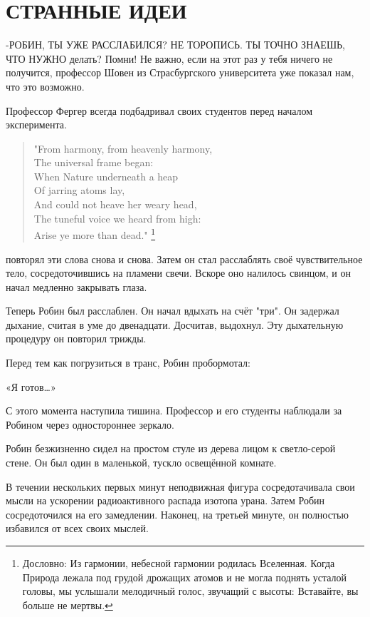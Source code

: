 \documentclass[a4paper,12pt]{book}
\begin{document}
\chapter{СТРАННЫЕ ИДЕИ}
\noindent\par-РОБИН, ТЫ УЖЕ РАССЛАБИЛСЯ? НЕ ТОРОПИСЬ. ТЫ ТОЧНО ЗНАЕШЬ, ЧТО НУЖНО делать? Помни! Не важно, если на этот раз у тебя ничего не получится, профессор Шовен из Страсбургского университета уже показал нам, что это возможно.
\par
Профессор Фергер всегда подбадривал своих студентов перед началом эксперимента.
\begin{quote}
"From harmony, from heavenly harmony,\\
The universal frame began:\\
When Nature underneath a heap\\
Of jarring atoms lay,\\
And could not heave her weary head,\\
The tuneful voice we heard from high:\\
Arise ye more than dead." \footnote{Дословно: Из гармонии, небесной гармонии родилась Вселенная. Когда Природа лежала под грудой дрожащих атомов и не могла поднять усталой головы, мы услышали мелодичный голос, звучащий с высоты: Вставайте, вы больше не мертвы.}
\end{quote}
 повторял эти слова снова и снова. Затем он стал расслаблять своё чувствительное тело, сосредоточившись на пламени свечи. Вскоре оно налилось свинцом, и он начал медленно закрывать глаза.
\par
Теперь Робин был расслаблен.  Он начал вдыхать на счёт "три". Он задержал дыхание, считая в уме до двенадцати. Досчитав, выдохнул. Эту дыхательную процедуру он повторил трижды.
\par
Перед тем как погрузиться в транс, Робин пробормотал:
\par
«Я готов…»\\
\par
С этого момента наступила тишина. Профессор и его студенты наблюдали за Робином через одностороннее зеркало.\\
\par
Робин безжизненно сидел на простом стуле из дерева лицом к светло-серой стене. Он был один в маленькой, тускло освещённой комнате.
\par
В течении нескольких первых минут неподвижная фигура сосредотачивала свои мысли на ускорении радиоактивного распада изотопа урана. Затем Робин сосредоточился на его замедлении. Наконец, на третьей минуте, он полностью избавился от всех своих мыслей.
\end{document}

